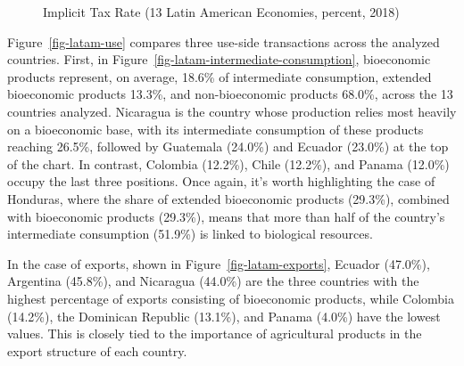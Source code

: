 \documentclass[
  letterpaper,
  DIV=11,
  numbers=noendperiod]{scrartcl}
\begin{document}
\begin{figure}


\caption{\label{fig-latam-implicit-tax}Implicit Tax Rate (13 Latin
American Economies, percent, 2018)}

\end{figure}%

Figure~\ref{fig-latam-use} compares three use-side transactions across
the analyzed countries. First, in
Figure~\ref{fig-latam-intermediate-consumption}, bioeconomic products
represent, on average, 18.6\% of intermediate consumption, extended
bioeconomic products 13.3\%, and non-bioeconomic products 68.0\%, across
the 13 countries analyzed. Nicaragua is the country whose production
relies most heavily on a bioeconomic base, with its intermediate
consumption of these products reaching 26.5\%, followed by Guatemala
(24.0\%) and Ecuador (23.0\%) at the top of the chart. In contrast,
Colombia (12.2\%), Chile (12.2\%), and Panama (12.0\%) occupy the last
three positions. Once again, it's worth highlighting the case of
Honduras, where the share of extended bioeconomic products (29.3\%),
combined with bioeconomic products (29.3\%), means that more than half
of the country's intermediate consumption (51.9\%) is linked to
biological resources.

In the case of exports, shown in Figure~\ref{fig-latam-exports}, Ecuador
(47.0\%), Argentina (45.8\%), and Nicaragua (44.0\%) are the three
countries with the highest percentage of exports consisting of
bioeconomic products, while Colombia (14.2\%), the Dominican Republic
(13.1\%), and Panama (4.0\%) have the lowest values. This is closely
tied to the importance of agricultural products in the export structure
of each country.
\end{document}
